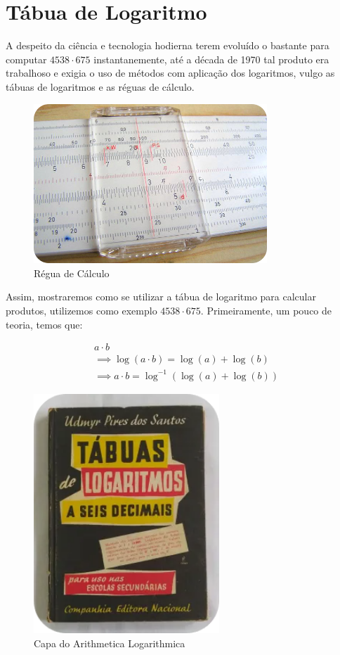 \section{Tábua de Logaritmo}

A despeito da ciência e tecnologia hodierna terem evoluído o bastante para computar $4538 \cdot 675$ instantanemente, até a década de 1970 tal produto era trabalhoso e exigia o uso de métodos com aplicação dos logaritmos, vulgo as tábuas de logaritmos e as réguas de cálculo.


\begin{figure}[H]
    \centering
    \includegraphics[height=6cm]{img/regua.png}
    \caption{Régua de Cálculo}
\end{figure}

Assim, mostraremos como se utilizar a tábua de logaritmo para calcular produtos, utilizemos como exemplo $4538\cdot 675$. Primeiramente, um pouco de teoria, temos que:

\begin{align*}
    & a\cdot b \\ 
    & \implies \log (a\cdot b) = \log (a) + \log (b)\\ 
    & \implies a\cdot b = \log ^{-1} (\log (a) + \log (b))
\end{align*}



\begin{figure}[H]
    \centering
    \includegraphics[height=9cm]{img/tabua.png}
    \caption{Capa do Arithmetica Logarithmica}
\end{figure}






